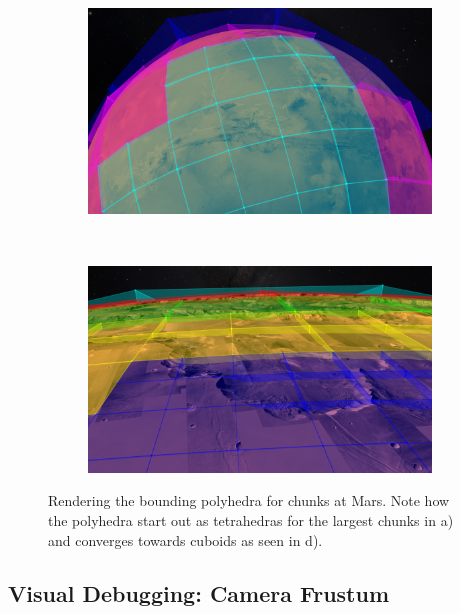 \begin{figure}[h]
\begin{subfigure}[bt]{0.45\textwidth}
    \end{subfigure}
    \begin{subfigure}[bt]{0.45\textwidth}
        \includegraphics[width=\textwidth]{figures/results/screenshots_thesis_old/bounds3.jpg}
        \caption{}
    \end{subfigure}
    ~
    \begin{subfigure}[bt]{0.45\textwidth}
        \includegraphics[width=\textwidth]{figures/results/screenshots_thesis_old/bounds4.jpg}
        \caption{}
    \end{subfigure}
    \caption{Rendering the bounding polyhedra for chunks at Mars. Note how the polyhedra start out as tetrahedras for the largest chunks in a) and converges towards cuboids as seen in d). }
    \label{fig:boundingvolume}
\end{figure}

\clearpage
\subsection{Visual Debugging: Camera Frustum}
\FloatBarrier

